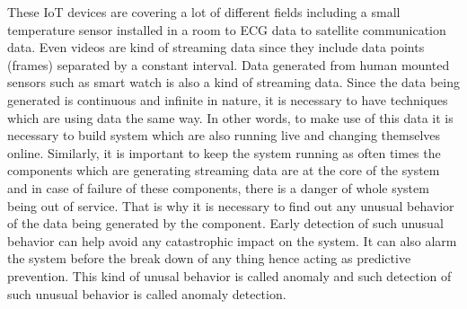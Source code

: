 \documentclass[12pt]{article}
\begin{document}
These IoT devices are covering a lot of different fields including a small temperature sensor installed in a room to ECG data to satellite communication data. Even videos are kind of streaming data since they include data points (frames) separated by a constant interval. Data generated from human mounted sensors such as smart watch is also a kind of streaming data. Since the data being generated is continuous and infinite in nature, it is necessary to have techniques which are using data the same way. In other words, to make use of this data it is necessary to build system which are also running live and changing themselves online. Similarly, it is important to keep the system running as often times the components which are generating streaming data are at the core of the system and in case of failure of these components, there is a danger of whole system being out of service. That is why it is necessary to find out any unusual behavior of the data being generated by the component. Early detection of such unusual behavior can help avoid any catastrophic impact on the system. It can also alarm the system before the break down of any thing hence acting as predictive prevention. This kind of unusal behavior is called anomaly and such detection of such unusual behavior is called anomaly detection.
\end{document}
